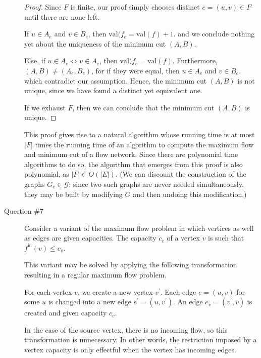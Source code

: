 \documentclass[letterpaper,11pt]{article}
\newcommand{\val}{\!\mathrm{val}}
\begin{document}
\begin{description}
        \begin{proof}
            Since $F$ is finite, our proof simply chooses distinct
            $e = (u, v) \in F$ until there are none left.

            If $u \in A_e$ and $v \in B_e$, then
            $\val{(f_e} = \val{(f)} + 1$.
            and we conclude nothing yet about
            the uniqueness of the minimum cut $(A, B)$.

            Else, if $u \in A_e \iff v \in A_e$, then
            $\val{(f_e} = \val{(f)}$. Furthermore, $(A, B) \neq (A_e, B_e)$,
            for if they were equal, then $u \in A_e$ and $v \in B_e$, which
            contradict our assumption. Hence, the minimum cut $(A, B)$ is not
            unique, since we have found a distinct yet equivalent one.

            If we exhaust $F$, then we can conclude that the minimum cut
            $(A, B)$ is unique.
        \end{proof}

        This proof gives rise to a natural algorithm whose running time is at
        most $|F|$ times the running time of an algorithm to compute the
        maximum flow and minimum cut of a flow network. Since there are
        polynomial time algorithms to do so, the algorithm that emerges from
        this proof is also polynomial, as $|F| \in O(|E|)$. (We can discount
        the construction of the graphs $G_e \in \mathcal{G}$; since two such
        graphs are never needed simultaneously, they may be built by modifying
        $G$ and then undoing this modification.)

    \item[Question \#7]

        Consider a variant of the maximum flow problem in which vertices as
        well as edges are given capacities. The capacity $c_v$ of a vertex $v$
        is such that $f^\mathrm{in}(v) \leq c_v$.

        This variant may be solved by applying the following transformation
        resulting in a regular maximum flow problem.

        For each vertex $v$, we create a new vertex $v^\prime$. Each edge
        $e = (u, v)$ for some $u$ is changed into a new edge
        $e^\prime = (u, v^\prime)$. An edge $e_v = (v^\prime, v)$ is created
        and given capacity $c_v$.

        In the case of the source vertex, there is no incoming flow, so this
        transformation is unnecessary. In other words, the restriction imposed
        by a vertex capacity is only effectful when the vertex has incoming
        edges.


\end{description}
\end{document}
